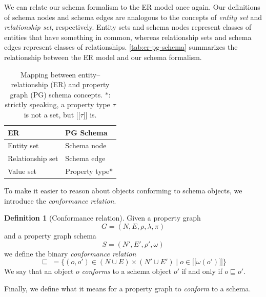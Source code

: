\documentclass{report}
\theoremstyle{definition}
\newtheorem{definition}{Definition}
\newcommand{\ptype}{\tau}
\newcommand{\lsem}{\ensuremath{[\![}}
\newcommand{\rsem}{\ensuremath{]\!]}}
\newcommand{\sem}[1]{\ensuremath{\lsem #1 \rsem}}
\newcommand{\conf}{\sqsubseteq}
\begin{document}
We can relate our schema formalism to the ER model once again. Our definitions of schema nodes and schema edges are analogous to the concepts of \emph{entity set} and \emph{relationship set}, respectively. Entity sets and schema nodes represent classes of entities that have something in common, whereas relationship sets and schema edges represent classes of relationships. \autoref{tab:er-pg-schema} summarizes the relationship between the ER model and our schema formalism.

\begin{table}[t]
  \centering
  \begin{tabular}{ll}
    \hline
    \textbf{ER}      & \textbf{PG Schema} \\
    \hline
    Entity set       & Schema node        \\
    Relationship set & Schema edge        \\
    Value set        & Property type*     \\
    \hline
  \end{tabular}
  \caption[Mapping between entity--relationship and property graph schema concepts]{Mapping between entity--relationship (ER) and property graph (PG) schema concepts. $*$: strictly speaking, a property type $\ptype$ is not a set, but $\sem{\ptype}$ is.}
  \label{tab:er-pg-schema}
\end{table}

To make it easier to reason about objects conforming to schema objects, we introduce the \emph{conformance relation}.

\begin{definition}[Conformance relation]
  Given a property graph $$G = (N, E, \rho, \lambda, \pi)$$ and a property graph schema $$S = (N', E', \rho', \omega)$$ we define the binary \emph{conformance relation} $$\conf \; = \{(o, o') \in (N \cup E) \times (N' \cup E') \mid o \in \sem{\omega(o')}\}$$ We say that an object $o$ \emph{conforms} to a schema object $o'$ if and only if $o \conf o'$.
\end{definition}

Finally, we define what it means for a property graph to \emph{conform} to a schema.
\end{document}
